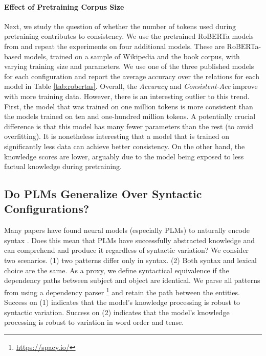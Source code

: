 \paragraph{Effect of Pretraining Corpus Size}
Next, we study the question of whether the number of tokens used during pretraining contributes to consistency.
We use the pretrained RoBERTa models from \citet{robertas} and repeat the experiments on four additional models.
These are RoBERTa-based models, trained on a sample of Wikipedia and the book corpus, with varying training size and parameters. We use one of the three published models for each configuration and report the average accuracy over the relations for each model in Table \ref{tab:robertas}.
Overall, the \textit{Accuracy} and
\textit{Consistent-Acc} improve
with more training data.
However, there is an interesting outlier to this trend.
First, the model that was trained on one million tokens is
more consistent than the models trained on ten and
one-hundred million tokens. A potentially crucial difference
is that this model
has many fewer parameters than the rest (to avoid overfitting). It is nonetheless interesting that a model that is trained on significantly less data can achieve better consistency. On the other hand, the knowledge scores are lower, arguably due to the model being exposed to less factual knowledge during pretraining.

\subsection{Do PLMs Generalize Over Syntactic Configurations?} 



Many papers have found neural models (especially PLMs) to naturally
encode syntax
\cite{linzen2016assessing,belinkov2017neural,marvin-linzen-2018-targeted,belinkov2019analysis,yoav-syntax,hewitt2019structural}.
Does this mean that PLMs have successfully abstracted
knowledge and can comprehend and produce it regardless of
syntactic variation?
We consider two scenarios. (1) two patterns differ only in
syntax. (2) Both  syntax and  lexical choice are the same.
As a proxy, we define syntactical equivalence if the dependency
paths between subject and object are identical.
We parse all patterns from \resource{} using a dependency parser \cite{spacy}\footnote{\url{https://spacy.io/}} and retain the path between the entities.
Success on (1) indicates
that the model's knowledge processing is robust to syntactic
variation.
Success on (2) indicates
that the model's knowledge processing is robust to
variation in word order and tense.


